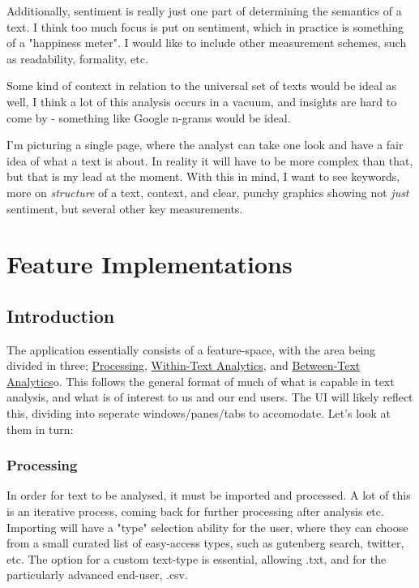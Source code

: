 \documentclass[11pt]{article}
\begin{document}
Additionally, sentiment is really just one part of determining the
semantics of a text. I think too much focus is put on sentiment, which
in practice is something of a "happiness meter". I would like to include
other measurement schemes, such as readability, formality, etc.

Some kind of context in relation to the universal set of texts would be
ideal as well, I think a lot of this analysis occurs in a vacuum, and
insights are hard to come by - something like Google n-grams would be
ideal.

I'm picturing a single page, where the analyst can take one look and
have a fair idea of what a text is about. In reality it will have to be
more complex than that, but that is my lead at the moment. With this in
mind, I want to see keywords, more on \emph{structure} of a text, context,
and clear, punchy graphics showing not \emph{just} sentiment, but several
other key measurements.

\section{Feature Implementations}
\label{sec:org0874674}
\subsection{Introduction}
\label{sec:org88e1533}
The application essentially consists of a feature-space, with the area
being divided in three; \hyperref[sec:org503efeb]{Processing}, \hyperref[sec:orgd9057cd]{Within-Text Analytics}, and
\hyperref[sec:org1272b59]{Between-Text Analytics}o. This follows the general format of much of
what is capable in text analysis, and what is of interest to us and our
end users. The UI will likely reflect this, dividing into seperate
windows/panes/tabs to accomodate. Let's look at them in turn:

\subsubsection{Processing}
\label{sec:org503efeb}
In order for text to be analysed, it must be imported and processed. A
lot of this is an iterative process, coming back for further processing
after analysis etc. Importing will have a "type" selection ability for
the user, where they can choose from a small curated list of easy-access
types, such as gutenberg search, twitter, etc. The option for a custom
text-type is essential, allowing .txt, and for the particularly advanced
end-user, .csv.
\end{document}
